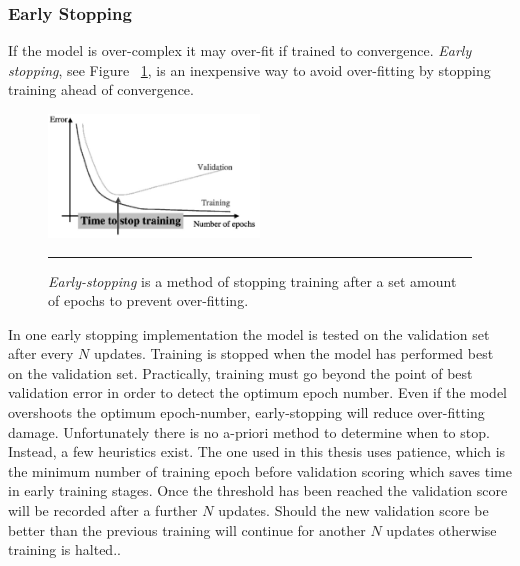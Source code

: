\subsubsection{Early Stopping}
If the model is over-complex it may over-fit if trained to convergence.
\textit{Early stopping}, see Figure ~\ref{fig:Overfitting_1}, is an inexpensive way to avoid over-fitting by stopping training ahead of convergence.
\begin{figure}[htbp]
	\centering
		\includegraphics[width = 0.5\textwidth]{./Figures/machine_learning_an_aglorithmic_perspective_overfitting.jpg}
		\rule{35em}{0.5pt}
	\caption[Early Stopping]{\textit{Early-stopping} is a method of stopping training after a set amount of epochs to prevent over-fitting\citep{bengio2012practical}.}
	\label{fig:Overfitting_1}
\end{figure}

In one early stopping implementation the model is tested on the validation set after every $N$ updates.
Training is stopped when the model has performed best on the validation set\citep{bengio2012practical}.
Practically, training must go beyond the point of best validation error in order to detect the optimum epoch number.
Even if the model overshoots the optimum epoch-number, early-stopping will reduce over-fitting damage.
Unfortunately there is no a-priori  method to determine when to stop.
Instead, a few heuristics exist.
The one used in this thesis uses patience, which is the minimum number of training epoch before validation scoring which saves time in early training stages.
Once the threshold has been reached the validation score will be recorded after a further $N$ updates.
Should the new validation score be better than the previous training will continue for another $N$ updates otherwise training is halted.\citep{bergstra2010theano}\citep{bastien2012theano}.


